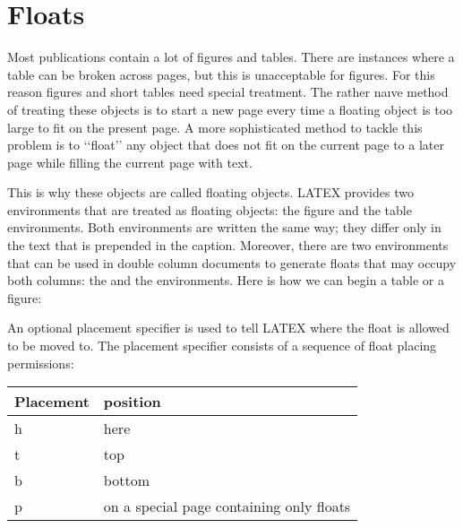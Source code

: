 
\let\frogking\lorem

\chapter{Floats}


Most publications contain a lot of figures and tables. There are instances where
a table can be broken across pages, but this is unacceptable for figures. For this reason
figures and short tables need special treatment. The rather naıve method of treating these
objects is to start a new page every time a floating object is too large to fit on the present
page. A more sophisticated method to tackle this problem is to ‘‘float’’ any object that
does not fit on the current page to a later page while filling the current page with text.

This is why these objects are called floating objects. LATEX provides two environments
that are treated as floating objects: the figure and the table environments. Both environments
are written the same way; they differ only in the text that is prepended in the
caption. Moreover, there are two environments that can be used in double column documents
to generate floats that may occupy both columns: the  and the 
environments. Here is how we can begin a table or a figure:


An optional placement specifier is used to tell LATEX where the float is allowed to be
moved to. The placement specifier consists of a sequence of float placing permissions:

\begin{table}[htbp]
\begin{tabular}{ll}
\toprule
Placement   & position\\
\midrule
h                 & here\\
t                  & top\\
b                 & bottom\\
p                 & on a special page containing only floats\\
\bottomrule
\end{tabular}
\end{table}




